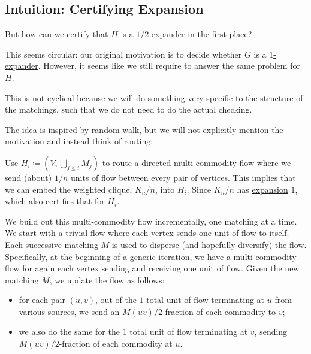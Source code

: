\subsection{Intuition: Certifying Expansion}
But how can we certify that \(H\) is a \hyperref[def:expander]{\(1 / 2\)-expander} in the first place?

\begin{problem*}
	This seems circular: our original motivation is to decide whether \(G\) is a \hyperref[def:expander]{\(1\)-expander}. However, it seems like we still require to answer the same problem for \(H\).
\end{problem*}
\begin{answer}
	This is not cyclical because we will do something very specific to the structure of the matchings, such that we do not need to do the actual checking.
\end{answer}

The idea is inspired by random-walk, but we will not explicitly mention the motivation and instead think of routing:

\begin{intuition}
	Use \(H_i \coloneqq (V, \bigcup_{j \leq i} M_j)\) to route a directed multi-commodity flow where we send (about) \(1 / n\) units of flow between every pair of vertices. This implies that we can embed the weighted clique, \(K_n / n\), into \(H_i\). Since \(K_n / n\) has \hyperref[def:expansion]{expansion} \(1\), which also certifies that for \(H_i\).
\end{intuition}

We build out this multi-commodity flow incrementally, one matching at a time. We start with a trivial flow where each vertex sends one unit of flow to itself. Each successive matching \(M\) is used to disperse (and hopefully diversify) the flow. Specifically, at the beginning of a generic iteration, we have a multi-commodity flow for again each vertex sending and receiving one unit of flow. Given the new matching \(M\), we update the flow as follows:
\begin{itemize}
	\item for each pair \((u, v)\), out of the \(1\) total unit of flow terminating at \(u\) from various sources, we send an \(M(uv) / 2\)-fraction of each commodity to \(v\);
	\item we also do the same for the \(1\) total unit of flow terminating at \(v\), sending \(M(uv) / 2\)-fraction of each commodity at \(u\).
\end{itemize}

